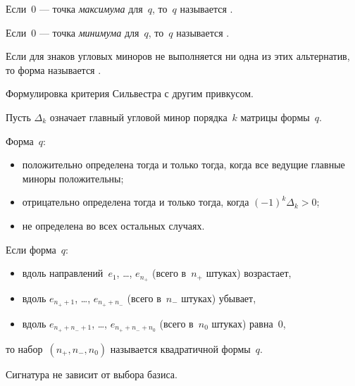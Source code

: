 \begin{definition}
	Если~$0$ --- точка \emph{максимума} для~$q$, то~$q$ называется .

	Если~$0$ --- точка \emph{минимума} для~$q$, то~$q$ называется .

	Если для знаков угловых миноров не выполняется ни одна из этих альтернатив, то форма называется .
\end{definition}

Формулировка критерия Сильвестра с другим привкусом.

\begin{theorem}
	Пусть $\Delta_k$ означает главный угловой минор порядка~$k$ матрицы формы~$q$.

	Форма~$q$:
	\begin{itemize}
		\item положительно определена тогда и только тогда, когда все ведущие главные миноры положительны;
		\item отрицательно определена тогда и только тогда, когда $(-1)^k\Delta_k > 0$;
		\item не определена во всех остальных случаях.
	\end{itemize}
\end{theorem}

\begin{definition}
	Если форма~$q$:
	\begin{itemize}
		\item вдоль направлений~$e_1$, \dots, $e_{n_+}$ (всего в~$n_+$ штуках) возрастает,
		\item вдоль $e_{n_+ + 1}$, \dots, $e_{n_+ + n_-}$ (всего в~$n_-$ штуках) убывает,
		\item вдоль $e_{n_+ + n_- + 1}$, \dots, $e_{n_+ + n_- + n_0}$ (всего в~$n_0$ штуках) равна~$0$,
	\end{itemize}
	то набор~$(n_+, n_-, n_0)$ называется  квадратичной формы~$q$.
\end{definition}

\begin{lemma}
	Сигнатура не зависит от выбора базиса.
\end{lemma}
